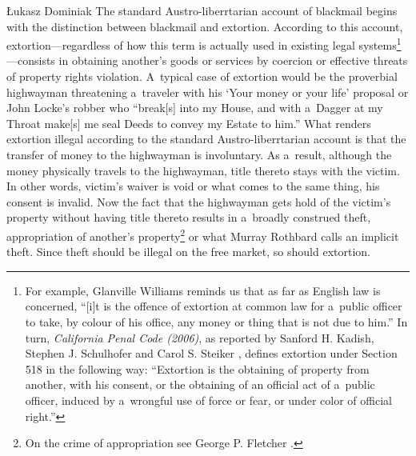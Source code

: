 \begin{artengenv}{Łukasz Dominiak}
The standard Austro-liberrtarian account of blackmail begins with the distinction between blackmail and extortion. According to this account, extortion---regardless of how this term is actually used in existing legal systems\footnote{For example, Glanville Williams 
\parencite*[][p.838]{williams_textbook_1983} %
 reminds us that as far as English law is concerned, ``[i]t is the offence of extortion at common law for a~public officer to take, by colour of his office, any money or thing that is not due to him.'' In turn, \textit{California Penal Code (2006)}, as reported by Sanford H. Kadish, Stephen J. Schulhofer and Carol S. Steiker 
\parencite*[][p.941]{kadish_criminal_2007}, %
 defines extortion under Section 518 in the following way: ``Extortion is the obtaining of property from another, with his consent, or the obtaining of an official act of a~public officer, induced by a~wrongful use of force or fear, or under color of official right.''}---consists in obtaining another's goods or services by coercion or effective threats of property rights violation. A~typical case of extortion would be the proverbial highwayman threatening a~traveler with his ‘Your money or your life' proposal or John Locke's 
\parencite[p.~385\ \mbox{[1698, II, Chap.~XVI, §176]}]{locke_two_2003}\nocite{locke_two_1689} %
 robber who ``break[s] into my House, and with a~Dagger at my Throat make[s] me seal Deeds to convey my Estate to him.'' What renders extortion illegal according to the standard Austro-liberrtarian account is that the transfer of money to the highwayman is involuntary. As a~result, although the money physically travels to the highwayman, title thereto stays with the victim. In other words, victim's waiver is void or what comes to the same thing, his consent is invalid. Now the fact that the highwayman gets hold of the victim's property without having title thereto results in a~broadly construed theft, appropriation of another's property\footnote{On the crime of appropriation see George P. Fletcher 
\parencite*[][pp.7–22]{fletcher_rethinking_2000}.%
} or what Murray Rothbard 
\parencite*[][p.77]{rothbard_ethics_1998} %
 calls an implicit theft. Since theft should be illegal on the free market, so should extortion.




\end{artengenv}
